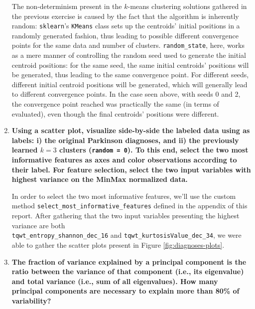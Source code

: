 \documentclass[12pt]{article}
\begin{document}
\begin{enumerate}[leftmargin=\labelsep,resume]
        The non-determinism present in the $k$-means clustering solutions gathered
        in the previous exercise is caused by the fact that the algorithm is
        inherently random: \texttt{sklearn}'s \texttt{KMeans} class sets up
        the centroids' initial positions in a randomly generated fashion,
        thus leading to possible different convergence points for the same
        data and number of clusters. \texttt{random\_state}, here, works
        as a mere manner of controlling the random seed used to generate
        the initial centroid positions: for the same seed, the same
        initial centroids' positions will be generated, thus leading to
        the same convergence point. For different seeds, different
        initial centroid positions will be generated, which will generally lead
        to different convergence points. In the case seen above, with seeds 0
        and 2, the convergence point reached was practically the same (in terms of
        evaluated), even though the final centroids' positions were different.

        \pagebreak

  \item \textbf{Using a scatter plot, visualize side-by-side the labeled data using as labels: i) the original
          Parkinson diagnoses, and ii) the previously learned $k = 3$ clusters (\texttt{random = 0}). To this end, select
          the two most informative features as axes and color observations according to their label. For feature
          selection, select the two input variables with highest variance on the MinMax normalized data.}

        In order to select the two most informative features, we'll use the
        custom method \texttt{select\_most\_informative\_features} defined in
        the appendix of this report. After gathering that the two
        input variables presenting the highest variance are both \\
        \texttt{tqwt\_entropy\_shannon\_dec\_16} and
        \texttt{tqwt\_kurtosisValue\_dec\_34}, we were able to gather the
        scatter plots present in Figure \ref{fig:diagnoses-plots}.

  \item \textbf{The fraction of variance explained by a principal component is the ratio between the
          variance of that component (i.e., its eigenvalue) and total variance (i.e., sum of all eigenvalues).
          How many principal components are necessary to explain more than 80\% of variability?}


\end{enumerate}
\end{document}
